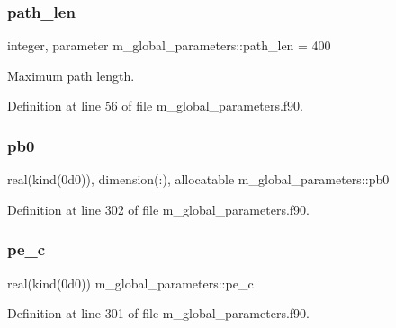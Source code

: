 \subsubsection{\texorpdfstring{path\+\_\+len}{path\_len}}
{\footnotesize\ttfamily integer, parameter m\+\_\+global\+\_\+parameters\+::path\+\_\+len = 400}



Maximum path length. 



Definition at line 56 of file m\+\_\+global\+\_\+parameters.\+f90.

\mbox{\label{namespacem__global__parameters_a1097b95561b65a9035e5f9218de577f9}} 
\subsubsection{\texorpdfstring{pb0}{pb0}}
{\footnotesize\ttfamily real(kind(0d0)), dimension(\+:), allocatable m\+\_\+global\+\_\+parameters\+::pb0}



Definition at line 302 of file m\+\_\+global\+\_\+parameters.\+f90.

\mbox{\label{namespacem__global__parameters_ac1375e5145e018847d9025e83e58b49d}} 
\subsubsection{\texorpdfstring{pe\+\_\+c}{pe\_c}}
{\footnotesize\ttfamily real(kind(0d0)) m\+\_\+global\+\_\+parameters\+::pe\+\_\+c}



Definition at line 301 of file m\+\_\+global\+\_\+parameters.\+f90.

\mbox{\label{namespacem__global__parameters_a8a75928178eef1550c6a0389ff12b44a}} 

